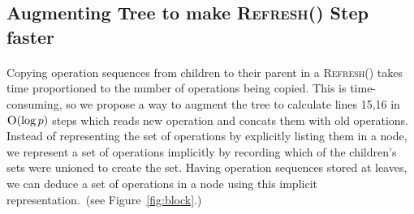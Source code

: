\documentclass[10pt]{article}
\theoremstyle{definition}
\begin{document}
\subsection{Augmenting Tree to make \textsc{Refresh}() Step faster}
\paragraph{}
Copying operation sequences from children to their parent in a \textsc{Refresh}() takes time proportioned to the number of operations being copied. This is time-consuming, so we propose a way to augment the tree to calculate lines 15,16 in $\textsc{O}(\log p)$ steps which reads new operation and concats them with old operations. Instead of representing the set of operations by explicitly listing them in a node, we represent a set of operations implicitly by recording which of the children's sets were unioned to create the set. Having operation sequences stored at leaves, we can deduce a set of operations in a node using this implicit representation.~(see Figure~\ref{fig:block}.)
\end{document}
